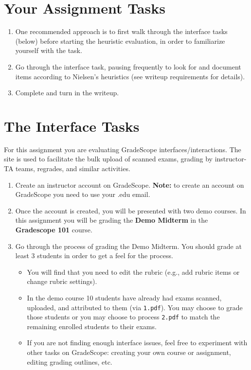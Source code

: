 \documentclass{article}
\begin{document}
\section{Your Assignment Tasks}
\begin{enumerate}
    \item One recommended approach is to first walk through the interface tasks (below) before starting the heuristic evaluation, in order to familiarize yourself with the task.
    \item Go through the interface task, pausing frequently to look for and document items according to Nielsen's heuristics (see writeup requirements for details).
    \item Complete and turn in the writeup.
\end{enumerate}

\section{The Interface Tasks}
For this assignment you are evaluating GradeScope interfaces/interactions. The site is used to facilitate the bulk upload of scanned exams, grading by instructor-TA teams, regrades, and similar activities.

\begin{enumerate}
    \item Create an instructor account on GradeScope. \textbf{Note:} to create an account on GradeScope you need to use your .edu email. 
    
    \item Once the account is created, you will be presented with two demo courses. In this assignment you will be grading the \textbf{Demo Midterm} in the \textbf{Gradescope 101} course.
    
    \item Go through the process of grading the Demo Midterm. You should grade at least 3 students in order to get a feel for the process. 
        \begin{itemize}
            \item You will find that you need to edit the rubric (e.g., add rubric items or change rubric settings). 
            \item In the demo course 10 students have already had exams scanned, uploaded, and attributed to them (via \texttt{1.pdf}). You may choose to grade those students or you may choose to process \texttt{2.pdf} to match the remaining enrolled students to their exams.
            \item If you are not finding enough interface issues, feel free to experiment with other tasks on GradeScope: creating your own course or assignment, editing grading outlines, etc.
        \end{itemize}

\end{enumerate}
\end{document}
